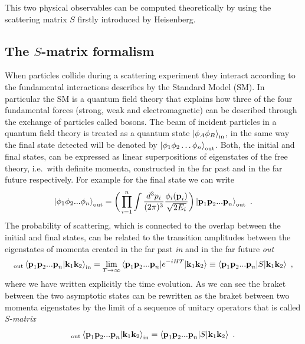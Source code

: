 \documentclass[../main/main.tex]{subfiles}
\begin{document}
This two physical observables can be computed theoretically by using the scattering matrix $S$ firstly introduced by Heisenberg.
\subsection{The $S$-matrix formalism}
When particles collide during a scattering experiment they interact according to the fundamental
interactions describes by the Standard Model (SM).
In particular the SM is a quantum field theory that explains how three of the four fundamental forces (strong, weak and electromagnetic) can be described through the exchange of particles called bosons.
\newline
The beam of incident particles in a quantum field theory is treated as a quantum state $\ket{\phi_A\phi_B}_{\text{in}}$, in the same way the final state detected will be denoted by $\ket{\phi_1 \phi_2 \dots \phi_n}_{\text{out}}$. 
Both, the initial and final states, can be expressed as linear superpositions of eigenstates of the free theory, i.e.\ with definite momenta, constructed in the far past and in the far future respectively.
For example for the final state we can write
\begin{equation}
	\ket{\phi_1 \phi_2 ...\phi_n}_\text{out} =\bigg( \prod_{i=1}^{n}\int
	 \frac{d^3 p_i}{(2 \pi)^3}
	\frac{\phi_i(\textbf{p}_i)}{\sqrt{2 E_i}} \bigg) \ket{\textbf{p}_1\textbf{p}_2...\textbf{p}_n}_\text{out} \ .
\end{equation}
The probability  of scattering, which is connected to the overlap between the initial and final states, can be related to the transition amplitudes between the eigenstates of momenta created in the far past \emph{in} and in the far future \emph{out}
\begin{equation}
	{}_\text{out}\braket{\textbf{p}_1\textbf{p}_2 ... \textbf{p}_n | \textbf{k}_1 \textbf{k}_2 }_\text{in} = \lim_{T \to \infty} \braket{\textbf{p}_1\textbf{p}_2 ... \textbf{p}_n |e^{- i H T} |\textbf{k}_1 \textbf{k}_2 } \equiv \braket{\textbf{p}_1\textbf{p}_2 ... \textbf{p}_n |S |\textbf{k}_1 \textbf{k}_2 } \ ,
\end{equation} 
where we have written explicitly the time evolution. As we can see the braket between the two asymptotic states can be rewritten as the braket between two momenta eigenstates by the limit of a sequence of unitary operators that is called \emph{S-matrix}
\begin{equation}
	{}_\text{out}\braket{\textbf{p}_1\textbf{p}_2 ... \textbf{p}_n | \textbf{k}_1 \textbf{k}_2 }_\text{in} =  \braket{\textbf{p}_1\textbf{p}_2 ... \textbf{p}_n |S |\textbf{k}_1 \textbf{k}_2 } \ .
\end{equation} 
\end{document}

